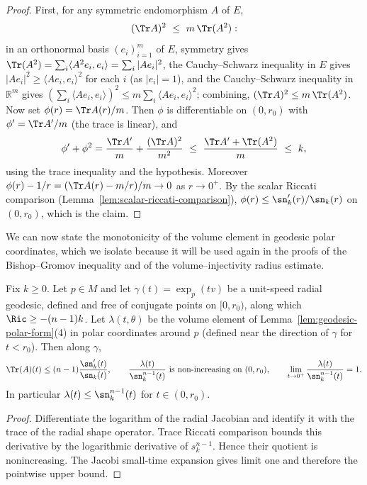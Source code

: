 \begin{proof}
\sketch
{}
\leanok
First, for any symmetric endomorphism $A$ of $E$,
$$(\Tr A)^2\ \le\ m\,\Tr(A^2):$$
in an orthonormal basis $(e_i)_{i=1}^m$ of $E$, symmetry gives
$\Tr(A^2)=\sum_i\langle A^2e_i,e_i\rangle=\sum_i|Ae_i|^2$, the
Cauchy--Schwarz inequality in $E$ gives
$|Ae_i|^2\ge\langle Ae_i,e_i\rangle^2$ for each $i$ (as $|e_i|=1$),
and the Cauchy--Schwarz inequality in $\mathbb{R}^m$ gives
$\left(\sum_i\langle Ae_i,e_i\rangle\right)^2
\le m\sum_i\langle Ae_i,e_i\rangle^2$; combining,
$(\Tr A)^2\le m\,\Tr(A^2)$. Now set $\phi(r)=\Tr A(r)/m$. Then
$\phi$ is differentiable on $(0,r_0)$ with $\phi'=\Tr A'/m$ (the
trace is linear), and
$$\phi'+\phi^2=\frac{\Tr A'}{m}+\frac{(\Tr A)^2}{m^2}
\ \le\ \frac{\Tr A'+\Tr(A^2)}{m}\ \le\ k,$$
using the trace inequality and the hypothesis. Moreover
$\phi(r)-1/r=(\Tr A(r)-m/r)/m\to0$ as $r\to0^+$. By the scalar
Riccati comparison (Lemma~\ref{lem:scalar-riccati-comparison}),
$\phi(r)\le\sn_k'(r)/\sn_k(r)$ on $(0,r_0)$, which is the claim.
\end{proof}

We can now state the monotonicity of the volume element in geodesic
polar coordinates, which we isolate because it will be used again in
the proofs of the Bishop--Gromov inequality and of the
volume--injectivity radius estimate.

\begin{lemma}
\label{lem:volume-element-comparison}

Fix $k\ge0$. Let $p\in M$ and let $\gamma(t)=\exp_p(tv)$ be a
unit-speed radial geodesic, defined and free of conjugate points on
$[0,r_0)$, along which $\Ric\ge-(n-1)k$. Let $\lambda(t,\theta)$ be
the volume element of Lemma~\ref{lem:geodesic-polar-form}(4) in
polar coordinates around $p$ (defined near the direction of
$\gamma$ for $t<r_0$). Then along $\gamma$,
$$\Tr(A)(t)\le(n-1)\frac{\sn_k'(t)}{\sn_k(t)},\qquad
\frac{\lambda(t)}{\sn_k^{n-1}(t)}\ \text{is non-increasing on
}(0,r_0),\qquad \lim_{t\to0^+}\frac{\lambda(t)}{\sn_k^{n-1}(t)}=1.$$
In particular $\lambda(t)\le\sn_k^{n-1}(t)$ for $t\in(0,r_0)$.
\end{lemma}

\begin{proof}
\sketch
{}
Differentiate the logarithm of the radial Jacobian and identify it with the trace of the radial shape operator. Trace Riccati comparison bounds this derivative by the logarithmic derivative of $s_k^{n-1}$. Hence their quotient is nonincreasing. The Jacobi small-time expansion gives limit one and therefore the pointwise upper bound.
\end{proof}

